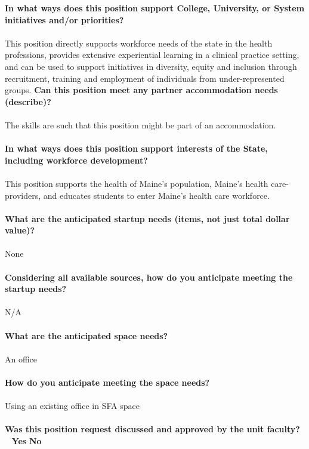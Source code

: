 \documentclass[11pt]{article}
\begin{document}
\newpage
\noindent\textbf{\rmfamily In what ways does this position support College, University, or System initiatives and/or priorities?}
\\~\\
This position directly supports workforce needs of the state in the health professions, provides extensive experiential learning in a clinical practice setting, and can be used to support initiatives in diversity, equity and inclusion through recruitment, training and employment of individuals from under-represented groups.\vfill
\noindent\textbf{\rmfamily Can this position meet any partner accommodation needs (describe)?}\\~\\
The skills are such that this position might be part of an accommodation.\\~\\
\vfill
\noindent\textbf{\rmfamily In what ways does this position support interests of the State, including workforce development?}\\~\\
This position supports the health of Maine's population, Maine's health care-providers, and educates students to enter Maine's health care workforce.\\~\\
\vfill
\newpage\noindent\textbf{\rmfamily What are the anticipated startup needs (items, not just total dollar value)?}\\~\\
None\\~\\
\vfill
\noindent\textbf{\rmfamily Considering all available sources, how do you anticipate meeting the startup needs?}\\~\\
N/A\\~\\
\vfill
\noindent\textbf{\rmfamily What are the anticipated space needs?}\\~\\
An office\\~\\
\vfill
\noindent\textbf{\rmfamily How do you anticipate meeting the space needs?} \\~\\
Using an existing office in SFA space\\~\\
\vfill
\noindent\textbf{\rmfamily Was this position request discussed and approved by the unit faculty?} \hfill ~ \hfill \textbf{\Large{\HollowBox} \normalsize{Yes}} \hfill \textbf{\Large{\HollowBox} \normalsize{ No}}\\~\\%
\end{document}
